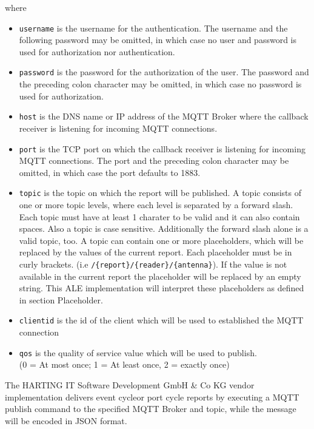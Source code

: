 \documentclass[11pt,a4paper,oneside]{article}
\newif\ifincludecc
\begin{document}
where
\begin{itemize}
\item 	\texttt{username} is the username for the authentication. The username and the following password may be omitted, in which case no user and password is used for authorization nor authentication.
\item 	\texttt{password} is the password for the authorization of the user. The password and the preceding colon character may be omitted, in which case no password is used for authorization.
\item	\texttt{host} is the DNS name or IP address of the MQTT Broker where the callback receiver is listening for incoming MQTT connections. 
\item	\texttt{port} is the TCP port on which the callback receiver is listening for incoming MQTT connections. The port and the preceding colon character may be omitted, in which case the port defaults to 1883.
\item	\texttt{topic} is the topic on which the report will be published. A topic consists of one or more topic levels, where each level is separated by a forward slash. Each topic must have at least 1 charater to be valid and it can also contain spaces. Also a topic is case sensitive. Additionally the forward slash alone is a valid topic, too. A topic can contain one or more placeholders, which will be replaced by the values of the current report. Each placeholder must be in curly brackets. (i.e \texttt{/\{report\}/\{reader\}/\{antenna\}}). If the value is not available in the current report the placeholder will be replaced by an empty string. This ALE implementation will interpret these placeholders as defined in section Placeholder.
\item	\texttt{clientid} is the id of the client which will be used to established the MQTT connection
\item	\texttt{qos} is the quality of service value which will be used to publish.\\(0 = At most once; 1 = At least once, 2 = exactly once)

\end{itemize}

The HARTING IT Software Development GmbH \& Co KG vendor implementation delivers event cycle\ifincludecc , command cycle \fi or port cycle reports by executing a MQTT publish command to the specified MQTT Broker and topic, while the message will be encoded in JSON format.

\fi
\newpage
\end{document}
